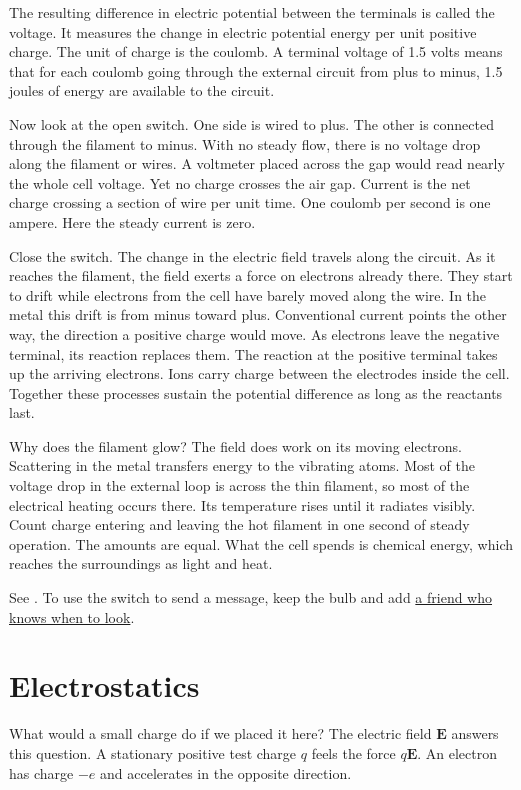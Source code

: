 The resulting difference in electric
potential between the terminals is called the
voltage. It measures the change in electric
potential energy per unit positive charge.
The unit of charge is the coulomb. A terminal
voltage of 1.5 volts means that for each
coulomb going through the external circuit
from plus to minus, 1.5 joules of energy are
available to the circuit.

Now look at the open switch. One side is
wired to plus. The other is connected through
the filament to minus. With no steady flow,
there is no voltage drop along the filament
or wires. A voltmeter placed across the gap
would read nearly the whole cell voltage. Yet
no charge crosses the air gap. Current is the
net charge crossing a section of wire per
unit time. One coulomb per second is one
ampere. Here the steady current is zero.

Close the switch. The change in the electric
field travels along the circuit. As it
reaches the filament, the field exerts a
force on electrons already there. They start
to drift while electrons from the cell have
barely moved along the wire. In the metal
this drift is from minus toward plus.
Conventional current points the other way,
the direction a positive charge would move.
As electrons leave the negative terminal,
its reaction replaces them. The reaction at
the positive terminal takes up the arriving
electrons. Ions carry charge between the
electrodes inside the cell. Together these
processes sustain the potential difference
as long as the reactants last.

Why does the filament glow? The field does
work on its moving electrons. Scattering in
the metal transfers energy to the vibrating
atoms. Most of the voltage drop in the
external loop is across the thin filament, so
most of the electrical heating occurs there.
Its temperature rises until it radiates
visibly. Count charge entering and leaving
the hot filament in one second of steady
operation. The amounts are equal. What the
cell spends is chemical energy, which reaches
the surroundings as light and heat.

See \cite[Sections 9.2, 9.5 and 10.1]
{university-physics-two}.
To use the switch to send a message, keep
the bulb and add
\href{https://www.heap-project.org/tag/0HHK}
{a friend who knows when to look}.

\section{Electrostatics}
What would a small charge do if we placed it
here? The electric field $\mathbf E$ answers
this question. A stationary positive test
charge $q$ feels the force $q\mathbf E$. An
electron has charge $-e$ and accelerates in
the opposite direction.

